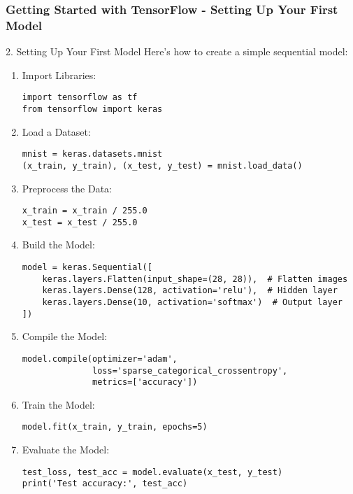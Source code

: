 \documentclass{beamer}
\begin{document}
\begin{frame}[fragile]
    \frametitle{Getting Started with TensorFlow - Setting Up Your First Model}
    \begin{block}{2. Setting Up Your First Model}
        Here's how to create a simple sequential model:
    \end{block}
    
    \begin{enumerate}
        \item Import Libraries:
            \begin{lstlisting}
import tensorflow as tf
from tensorflow import keras
            \end{lstlisting}
        \item Load a Dataset:
            \begin{lstlisting}
mnist = keras.datasets.mnist
(x_train, y_train), (x_test, y_test) = mnist.load_data()
            \end{lstlisting}
        \item Preprocess the Data:
            \begin{lstlisting}
x_train = x_train / 255.0
x_test = x_test / 255.0
            \end{lstlisting}
        \item Build the Model:
            \begin{lstlisting}
model = keras.Sequential([
    keras.layers.Flatten(input_shape=(28, 28)),  # Flatten images
    keras.layers.Dense(128, activation='relu'),  # Hidden layer
    keras.layers.Dense(10, activation='softmax')  # Output layer
])
            \end{lstlisting}
        \item Compile the Model:
            \begin{lstlisting}
model.compile(optimizer='adam',
              loss='sparse_categorical_crossentropy',
              metrics=['accuracy'])
            \end{lstlisting}
        \item Train the Model:
            \begin{lstlisting}
model.fit(x_train, y_train, epochs=5)
            \end{lstlisting}
        \item Evaluate the Model:
            \begin{lstlisting}
test_loss, test_acc = model.evaluate(x_test, y_test)
print('Test accuracy:', test_acc)
            \end{lstlisting}
    \end{enumerate}
\end{frame}
\end{document}
